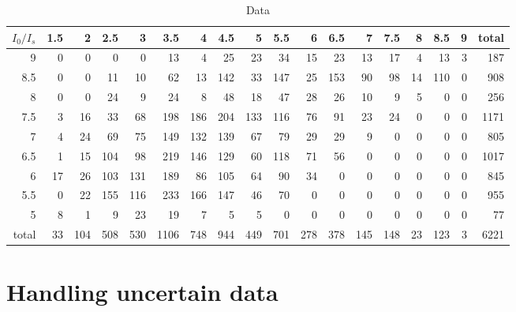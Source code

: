 \begin{table}[ht]
  \centering
        \small
        \setlength\tabcolsep{2pt}
\begin{tabular}{|r|r|r|r|r|r|r|r|r|r|r|r|r|r|r|r|r||r|}
  \hline
$I_0 / I_s$ & 1.5 & 2 & 2.5 & 3 & 3.5 & 4 & 4.5 & 5 & 5.5 & 6 & 6.5 & 7 & 7.5 & 8 & 8.5 & 9 & total \\ 
  \hline
9 & 0 & 0 & 0 & 0 & 13 & 4 & 25 & 23 & 34 & 15 & 23 & 13 & 17 & 4 & 13 & 3 & 187 \\ 
  8.5 & 0 & 0 & 11 & 10 & 62 & 13 & 142 & 33 & 147 & 25 & 153 & 90 & 98 & 14 & 110 & 0 & 908 \\ 
  8 & 0 & 0 & 24 & 9 & 24 & 8 & 48 & 18 & 47 & 28 & 26 & 10 & 9 & 5 & 0 & 0 & 256 \\ 
  7.5 & 3 & 16 & 33 & 68 & 198 & 186 & 204 & 133 & 116 & 76 & 91 & 23 & 24 & 0 & 0 & 0 & 1171 \\ 
  7 & 4 & 24 & 69 & 75 & 149 & 132 & 139 & 67 & 79 & 29 & 29 & 9 & 0 & 0 & 0 & 0 & 805 \\ 
  6.5 & 1 & 15 & 104 & 98 & 219 & 146 & 129 & 60 & 118 & 71 & 56 & 0 & 0 & 0 & 0 & 0 & 1017 \\ 
  6 & 17 & 26 & 103 & 131 & 189 & 86 & 105 & 64 & 90 & 34 & 0 & 0 & 0 & 0 & 0 & 0 & 845 \\ 
  5.5 & 0 & 22 & 155 & 116 & 233 & 166 & 147 & 46 & 70 & 0 & 0 & 0 & 0 & 0 & 0 & 0 & 955 \\ 
  5 & 8 & 1 & 9 & 23 & 19 & 7 & 5 & 5 & 0 & 0 & 0 & 0 & 0 & 0 & 0 & 0 & 77 \\ 
  \hline
  total & 33 & 104 & 508 & 530 & 1106 & 748 & 944 & 449 & 701 & 278 & 378 & 145 & 148 & 23 & 123 & 3 & 6221 \\ 
   \hline
\end{tabular}
\caption[Data]{Data}
\label{table:Data}
\end{table}

\section{Handling uncertain data}

